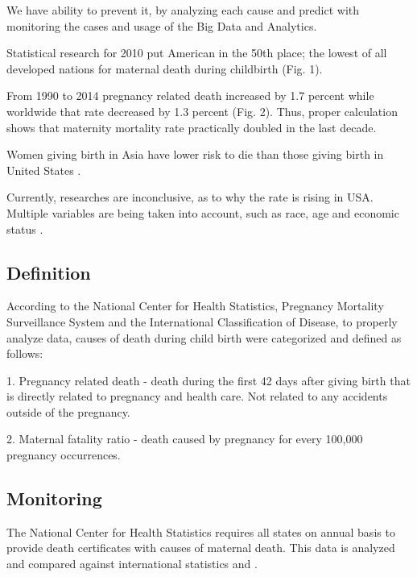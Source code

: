 \documentclass[sigconf]{acmart}
\begin{document}
We have ability to prevent it, by analyzing each cause and predict with monitoring the cases and usage of the Big Data and Analytics. 

Statistical research for 2010 put American in the 50th place; the lowest of all developed nations for maternal death during childbirth (Fig. 1).

From 1990 to 2014 pregnancy related death increased by 1.7 percent while worldwide that rate decreased by 1.3 percent (Fig. 2). Thus, proper calculation shows that maternity mortality rate practically doubled in the last decade.

Women giving birth in Asia have lower risk to die than those giving birth in United States \cite{world2012trends}.

Currently, researches are inconclusive, as to why the rate is rising in USA. Multiple variables are being taken into account, such as race, age and economic status \cite{creanga2012race}.

\subsection{Definition}

According to the National Center for Health Statistics, Pregnancy Mortality Surveillance System and the International Classification of Disease, to properly analyze data, causes of death during child birth were categorized and defined \cite{callaghan2012overview} as follows:


1. Pregnancy related death - death during the first 42 days after giving birth that is directly related to pregnancy and health care. Not related to any accidents outside of the pregnancy.
   


2. Maternal fatality ratio - death caused by pregnancy for every 100,000 pregnancy occurrences.


\subsection{Monitoring}

The National Center for Health Statistics requires all states on annual basis to provide death certificates with causes of maternal death. This data is analyzed and compared against international statistics \cite{hoyert2007maternal} and \cite{creanga2014maternal}.
\end{document}

